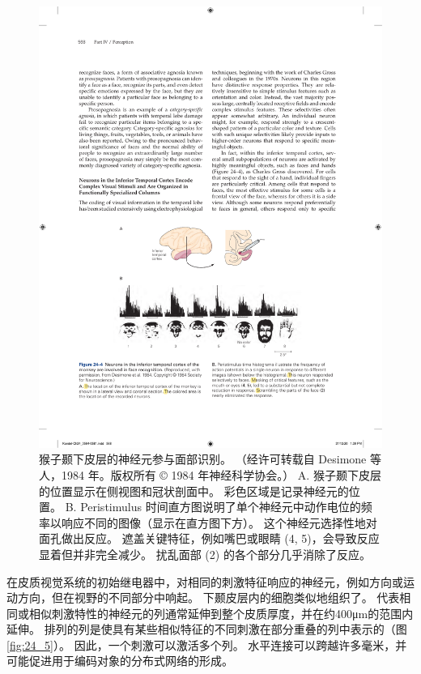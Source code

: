 \begin{figure}[htbp]
	\centering
	\includegraphics[width=0.7\linewidth]{chap24/fig_24_4}
	\caption{猴子颞下皮层的神经元参与面部识别。 （经许可转载自 Desimone 等人，1984 年。版权所有 © 1984 年神经科学协会。） 
		A. 猴子颞下皮层的位置显示在侧视图和冠状剖面中。 彩色区域是记录神经元的位置。 
		B. Peristimulus 时间直方图说明了单个神经元中动作电位的频率以响应不同的图像（显示在直方图下方）。
		这个神经元选择性地对面孔做出反应。
		遮盖关键特征，例如嘴巴或眼睛 (4, 5)，会导致反应显着但并非完全减少。
		扰乱面部 (2) 的各个部分几乎消除了反应。}
	\label{fig:24_4}
\end{figure}


在皮质视觉系统的初始继电器中，对相同的刺激特征响应的神经元，例如方向或运动方向，但在视野的不同部分中响起。 
下颞皮层内的细胞类似地组织了。 
代表相同或相似刺激特性的神经元的列通常延伸到整个皮质厚度，并在约400μm的范围内延伸。 
排列的列是使具有某些相似特征的不同刺激在部分重叠的列中表示的（图 \ref{fig:24_5}）。 
因此，一个刺激可以激活多个列。 水平连接可以跨越许多毫米，并可能促进用于编码对象的分布式网络的形成。

